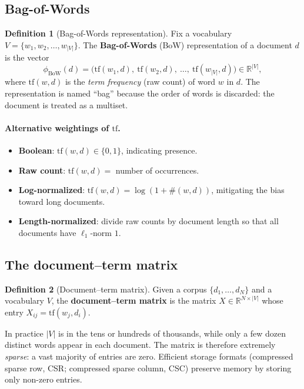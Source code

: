 \documentclass[12pt,a4paper]{report}
\theoremstyle{definition}
\newtheorem{definition}{Definition}[section]
\theoremstyle{remark}
\begin{document}
\subsection{Bag-of-Words}

\begin{definition}[Bag-of-Words representation]
Fix a vocabulary $V = \{w_1, w_2, \dots, w_{|V|}\}$. The \textbf{Bag-of-Words} (BoW) representation of a document $d$ is the vector
\[ \phi_{\text{BoW}}(d) = \big(\mathrm{tf}(w_1, d),\ \mathrm{tf}(w_2, d),\ \dots,\ \mathrm{tf}(w_{|V|}, d)\big) \in \mathbb{R}^{|V|}, \]
where $\mathrm{tf}(w, d)$ is the \emph{term frequency} (raw count) of word $w$ in $d$. The representation is named ``bag'' because the order of words is discarded: the document is treated as a multiset.
\end{definition}

\paragraph{Alternative weightings of $\mathrm{tf}$.}
\begin{itemize}
    \item \textbf{Boolean}: $\mathrm{tf}(w, d) \in \{0, 1\}$, indicating presence.
    \item \textbf{Raw count}: $\mathrm{tf}(w, d) = $ number of occurrences.
    \item \textbf{Log-normalized}: $\mathrm{tf}(w, d) = \log(1 + \#(w, d))$, mitigating the bias toward long documents.
    \item \textbf{Length-normalized}: divide raw counts by document length so that all documents have $\ell_1$-norm $1$.
\end{itemize}

\subsection{The document--term matrix}

\begin{definition}[Document--term matrix]
Given a corpus $\{d_1, \dots, d_N\}$ and a vocabulary $V$, the \textbf{document--term matrix} is the matrix $X \in \mathbb{R}^{N \times |V|}$ whose entry $X_{ij} = \mathrm{tf}(w_j, d_i)$.
\end{definition}

In practice $|V|$ is in the tens or hundreds of thousands, while only a few dozen distinct words appear in each document. The matrix is therefore extremely \emph{sparse}: a vast majority of entries are zero. Efficient storage formats (compressed sparse row, CSR; compressed sparse column, CSC) preserve memory by storing only non-zero entries.
\end{document}

